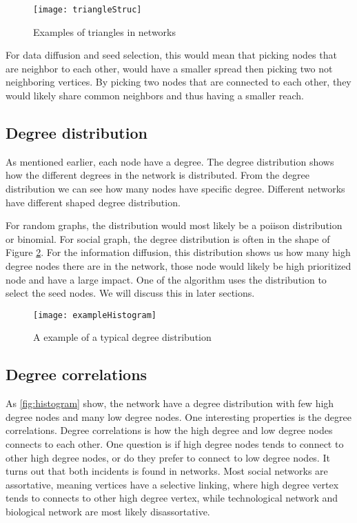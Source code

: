 \begin{figure}
	\texttt{[image: triangleStruc]}
	\caption{Examples of triangles in networks} 
	\label{fig:triangleStruc}
\end{figure}


For data diffusion and seed selection, this would mean that picking nodes that are neighbor to each other, would have a smaller spread then picking two not neighboring vertices. By picking two nodes that are connected to each other, they would likely share common neighbors and thus having a smaller reach.  

\subsection{Degree distribution}
As mentioned earlier, each node have a degree. The degree distribution shows how the different degrees in the network is distributed. From the degree distribution we can see how many nodes have specific degree. Different networks have different shaped degree distribution.

For random graphs, the distribution would most likely be a poiison distribution or binomial. For social graph, the degree distribution is often in the shape of Figure \ref{fig:exampleHistogram}. For the information diffusion, this distribution shows us how many high degree nodes there are in the network, those node would likely be high prioritized node and have a large impact. One of the algorithm uses the distribution to select the seed nodes. We will discuss this in later sections.  


\begin{figure}
	\texttt{[image: exampleHistogram]}
	\caption{A example of a typical degree distribution} 
	\label{fig:exampleHistogram}
\end{figure}


\subsection{Degree correlations}
As \ref{fig:histogram} show, the network have a degree distribution with few high degree nodes and many low degree nodes. One interesting properties is the degree correlations. Degree correlations is how the high degree and low degree nodes connects to each other. One question is if high degree nodes tends to connect to other high degree nodes, or do they prefer to connect to low degree nodes. It turns out that both incidents is found in networks\cite{complexNetwork}. Most social networks are assortative, meaning vertices have a selective linking, where high degree vertex tends to connects to other high degree vertex, while technological network and biological network are most likely disassortative\cite{AssortativeMixing2002}. 

